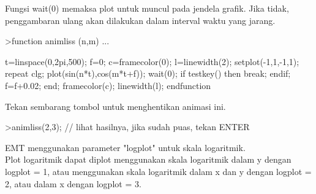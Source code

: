 \documentclass[a4paper,10pt]{article}
\begin{document}
\begin{eulernotebook}
\begin{eulercomment}
Fungsi wait(0) memaksa plot untuk muncul pada jendela grafik. Jika
tidak, penggambaran ulang akan dilakukan dalam interval waktu yang
jarang.
\end{eulercomment}
\begin{eulerprompt}
>function animliss (n,m) ...
\end{eulerprompt}
\begin{eulerudf}
  t=linspace(0,2pi,500);
  f=0;
  c=framecolor(0);
  l=linewidth(2);
  setplot(-1,1,-1,1);
  repeat
    clg;
    plot(sin(n*t),cos(m*t+f));
    wait(0);
    if testkey() then break; endif;
    f=f+0.02;
  end;
  framecolor(c);
  linewidth(l);
  endfunction
\end{eulerudf}
\begin{eulercomment}
Tekan sembarang tombol untuk menghentikan animasi ini.
\end{eulercomment}
\begin{eulerprompt}
>animliss(2,3); // lihat hasilnya, jika sudah puas, tekan ENTER
\end{eulerprompt}
\begin{eulercomment}
EMT menggunakan parameter "logplot" untuk skala logaritmik.\\
Plot logaritmik dapat diplot menggunakan skala logaritmik dalam y
dengan logplot = 1, atau menggunakan skala logaritmik dalam x dan y
dengan logplot = 2, atau dalam x dengan logplot = 3.


\end{eulercomment}
\end{eulernotebook}
\end{document}

